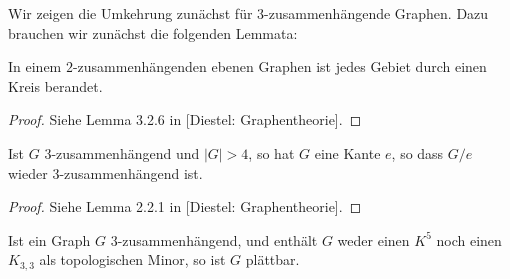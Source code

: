 \documentclass[10pt,b5paper]{article}
\begin{document}
Wir zeigen die Umkehrung zunächst für $3$-zusammenhängende Graphen. Dazu brauchen wir zunächst die folgenden Lemmata:

\begin{lemma}\label{lem:kuratowski-2lemma}
In einem $2$-zusammenhängenden ebenen Graphen ist jedes Gebiet durch einen Kreis berandet.
\end{lemma}

\begin{proof}
Siehe Lemma 3.2.6 in [Diestel: Graphentheorie].
\end{proof}

\begin{lemma}\label{lem:kuratowski-3lemma}
Ist $G$ $3$-zusammenhängend und $|G|>4$, so hat $G$ eine Kante $e$, so dass $G/e$ wieder $3$-zusammenhängend ist.
\end{lemma}

\begin{proof}
Siehe Lemma 2.2.1 in [Diestel: Graphentheorie].
\end{proof}

\begin{proposition}
Ist ein Graph $G$ $3$-zusammenhängend, und enthält $G$ weder einen $K^5$ noch einen $K_{3,3}$ als topologischen Minor, so ist $G$ plättbar.
\end{proposition}
\end{document}
